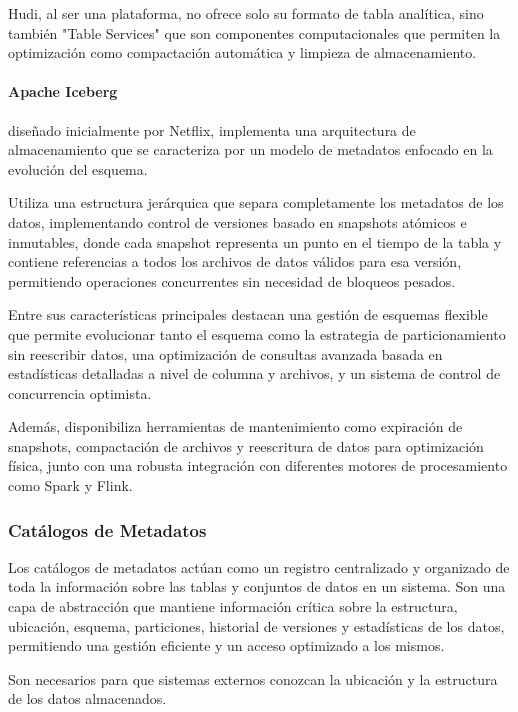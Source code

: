 Hudi, al ser una plataforma, no ofrece solo su formato de tabla analítica, 
sino también "Table Services" que son componentes computacionales que permiten la optimización como compactación automática 
y limpieza de almacenamiento. 

\newpage
\paragraph{Apache Iceberg}diseñado inicialmente por Netflix, implementa una arquitectura de almacenamiento que se caracteriza 
por un modelo de metadatos enfocado en la evolución del esquema. 

Utiliza una estructura jerárquica que separa completamente los metadatos de los datos, 
implementando control de versiones basado en snapshots atómicos e inmutables, 
donde cada snapshot representa un punto en el tiempo de la tabla y contiene referencias a todos los archivos de datos válidos para esa versión, 
permitiendo operaciones concurrentes sin necesidad de bloqueos pesados.

Entre sus características principales destacan una gestión de esquemas flexible que permite evolucionar tanto el esquema 
como la estrategia de particionamiento sin reescribir datos, 
una optimización de consultas avanzada basada en estadísticas detalladas a nivel de columna y archivos, 
y un sistema de control de concurrencia optimista. 

Además, disponibiliza herramientas de mantenimiento como expiración de snapshots, compactación de archivos 
y reescritura de datos para optimización física, 
junto con una robusta integración con diferentes motores de procesamiento como Spark y Flink.

\newpage

\subsubsection{Catálogos de Metadatos}
Los catálogos de metadatos actúan como un registro centralizado y organizado de toda la información sobre las tablas y conjuntos de datos en un sistema. 
Son una capa de abstracción que mantiene información crítica sobre la estructura, ubicación, esquema, particiones, historial de versiones y estadísticas de los datos, 
permitiendo una gestión eficiente y un acceso optimizado a los mismos.

Son necesarios para que sistemas externos conozcan la ubicación y la estructura de los datos almacenados. 

